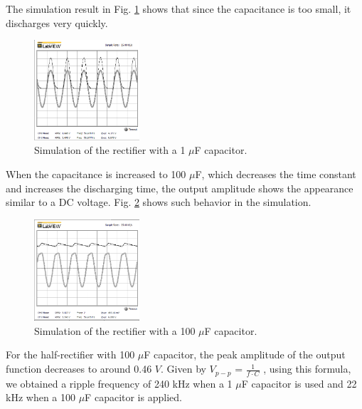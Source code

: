 \documentclass[letterpaper, 10 pt, conference]{ieeeconf}  %
\begin{document}
\par The simulation result in Fig. \ref{fig:rectifier_4} shows that since the
capacitance is too small, it discharges very quickly.
\begin{figure}[h]
  \centering
  \includegraphics[width=0.35\textwidth]{images/halfwave_1miuf.png}
  \caption{Simulation of the rectifier with a 1 $\mu$F capacitor.}
  \label{fig:rectifier_4}
\end{figure}
\par When the capacitance is increased to 100 $\mu$F, which decreases the time
constant and increases the discharging time, the output amplitude shows the appearance
similar to a DC voltage. Fig. \ref{fig:rectifier_5} shows such behavior in the simulation.
\begin{figure}[h]
  \centering
  \includegraphics[width=0.35\textwidth]{images/halfwave_100miuf.png}
  \caption{Simulation of the rectifier with a 100 $\mu$F capacitor.}
  \label{fig:rectifier_5}
\end{figure}
\clearpage
\par For the half-rectifier with 100 $\mu$F capacitor, the peak amplitude of
the output function decreases to around 0.46 $V$. Given by $V_{p-p}$ = $\frac {1}{f \cdot C}$
, using this formula, we obtained a ripple frequency of 240 kHz when a 1 $\mu$F
capacitor is used and 22 kHz when a 100 $\mu$F capacitor is applied.
\end{document}
